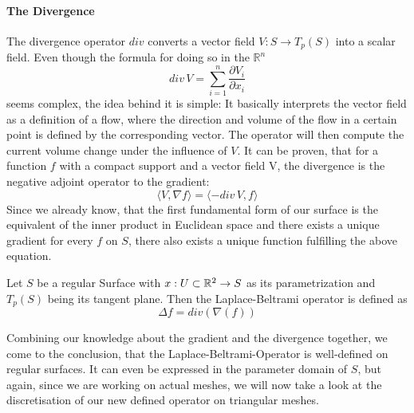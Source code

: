 \paragraph{The Divergence}
The divergence operator $div$ converts a vector field $V: S \rightarrow T_p(S)$ into a scalar field.
Even though the formula for doing so in the $\mathbb{R}^n$
\begin{equation}
	div\, V = \sum_{i=1}^{n} \frac{\partial V_i}{\partial x_i}
\end{equation}
seems complex, the idea behind it is simple:
It basically interprets the vector field as a definition of a flow, where the direction and volume of the flow in a certain point is defined by the corresponding vector.
The operator will then compute the current volume change under the influence of $V$.
It can be proven, that for a function $f$ with a compact support and a vector field V, the divergence is the negative adjoint operator to the gradient:\cite{polymesh}
\begin{equation}
	\langle V, \nabla f \rangle = \langle -div\, V, f \rangle
\end{equation}
Since we already know, that the first fundamental form of our surface is the equivalent of the inner product in Euclidean space and there exists a unique gradient for every $f$ on $S$, there also exists a unique function fulfilling the above equation.

\begin{mydef}
	Let $S$ be a regular Surface with $x:U\subset\mathbb{R}^2 \rightarrow S$ as its parametrization and $T_p(S)$ being its tangent plane.
	Then the Laplace-Beltrami operator is defined as
	$$\Delta f = div(\nabla(f))$$
\end{mydef}
Combining our knowledge about the gradient and the divergence together, we come to the conclusion, that the Laplace-Beltrami-Operator is well-defined on regular surfaces.
It can even be expressed in the parameter domain of $S$, but again, since we are working on actual meshes, we will now take a look at the discretisation of our new defined operator on triangular meshes.

